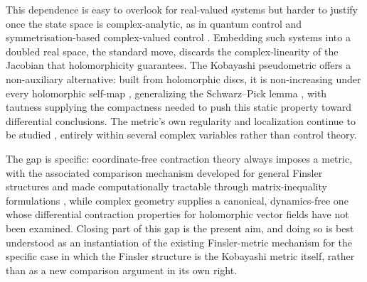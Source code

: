 \documentclass[preprint,12pt,authoryear]{elsarticle}
\begin{document}
This dependence is easy to overlook for real-valued systems but harder to justify once the state space is complex-analytic, as in quantum control \cite{mirrahimi2007stabilizing} and symmetrisation-based complex-valued control \cite{doriacerezo2026symmetrisation}. Embedding such systems into a doubled real space, the standard move, discards the complex-linearity of the Jacobian that holomorphicity guarantees. The Kobayashi pseudometric offers a non-auxiliary alternative: built from holomorphic discs, it is non-increasing under every holomorphic self-map \cite{kobayashi1967invariant}, generalizing the Schwarz--Pick lemma \cite{ahlfors1979complex}, with tautness \cite{abate1989iteration} supplying the compactness needed to push this static property toward differential conclusions. The metric's own regularity and localization continue to be studied \cite{sarkarad2023localization,nikolov2023visibility,bharali2023unbounded,chakrabarti2025hermitian}, entirely within several complex variables rather than control theory.

The gap is specific: coordinate-free contraction theory always imposes a metric, with the associated comparison mechanism developed for general Finsler structures \cite{forni2014differential} and made computationally tractable through matrix-inequality formulations \cite{kawano2023lmi}, while complex geometry supplies a canonical, dynamics-free one whose differential contraction properties for holomorphic vector fields have not been examined. Closing part of this gap is the present aim, and doing so is best understood as an instantiation of the existing Finsler-metric mechanism for the specific case in which the Finsler structure is the Kobayashi metric itself, rather than as a new comparison argument in its own right.
\end{document}
